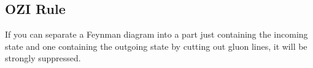 \subsection{OZI Rule}\label{ozi}
If you can separate a Feynman diagram into a part just containing the incoming state and one containing the outgoing state by cutting out gluon lines, it will be strongly suppressed.

